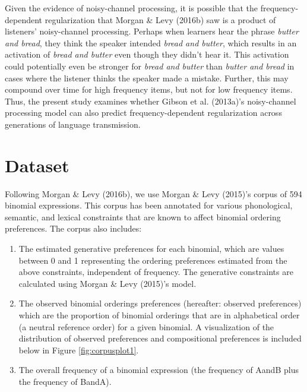 \documentclass[10pt, letterpaper]{article}
\begin{document}
Given the evidence of noisy-channel processing, it is possible that the
frequency-dependent regularization that Morgan \& Levy (2016b) saw is a
product of listeners' noisy-channel processing. Perhaps when learners
hear the phrase \emph{butter and bread}, they think the speaker intended
\emph{bread and butter}, which results in an activation of \emph{bread
and butter} even though they didn't hear it. This activation could
potentially even be stronger for \emph{bread and butter} than
\emph{butter and bread} in cases where the listener thinks the speaker
made a mistake. Further, this may compound over time for high frequency
items, but not for low frequency items. Thus, the present study examines
whether Gibson et al. (2013a)'s noisy-channel processing model can also
predict frequency-dependent regularization across generations of
language transmission.

\hypertarget{dataset}{%
\section{Dataset}\label{dataset}}

Following Morgan \& Levy (2016b), we use Morgan \& Levy (2015)'s corpus
of 594 binomial expressions. This corpus has been annotated for various
phonological, semantic, and lexical constraints that are known to affect
binomial ordering preferences. The corpus also includes:

\begin{enumerate}
\def\labelenumi{\arabic{enumi}.}
\item
  The estimated generative preferences for each binomial, which are
  values between 0 and 1 representing the ordering preferences estimated
  from the above constraints, independent of frequency. The generative
  constraints are calculated using Morgan \& Levy (2015)'s model.
\item
  The observed binomial orderings preferences (hereafter: observed
  preferences) which are the proportion of binomial orderings that are
  in alphabetical order (a neutral reference order) for a given
  binomial. A visualization of the distribution of observed preferences
  and compositional preferences is included below in Figure
  \ref{fig:corpusplot1}.
\item
  The overall frequency of a binomial expression (the frequency of AandB
  plus the frequency of BandA).
\end{enumerate}
\end{document}
